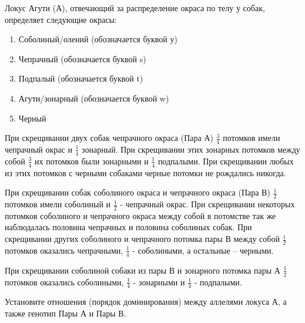 
Локус Агути (А), отвечающий за распределение окраса по телу у собак, определяет следующие окрасы:

\begin{enumerate}
    \item Соболиный/олений (обозначается буквой у)
    \item Чепрачный (обозначается буквой s) 
    \item Подпалый (обозначается буквой t) 
    \item Агути/зонарный (обозначается буквой w) \newline
    \item Черный
\end{enumerate}

При скрещивании двух собак чепрачного окраса (Пара А) $\frac{3}{4}$ потомков имели чепрачный окрас и $\frac{1}{4}$ зонарный. При скрещивании этих 
зонарных потомков между собой $\frac{3}{4}$ их потомков были зонарными и $\frac{1}{4}$ подпалыми. При скрещивании любых из этих потомков с черными собаками черные потомки не рождались никогда.

При скрещивании собак соболиного окраса и чепрачного окраса (Пара В) $\frac{1}{2}$ потомков имели соболиный и $\frac{1}{2}$ - чепрачный окрас. 
При скрещивании некоторых потомков соболиного и чепрачного окраса между собой в потомстве так же наблюдалась половина 
чепрачных и половина соболиных собак. При скрещивании других соболиного и чепрачного потомка пары В между собой $\frac{1}{2}$ 
потомков оказались чепрачными, $\frac{1}{4}$  - соболиными, а остальные – черными. 

При скрещивании соболиной собаки из пары В и зонарного потомка пары А $\frac{1}{2}$ потомков оказались соболиными, $\frac{1}{4}$ - зонарными и $\frac{1}{4}$ - подпалыми.

Установите отношения (порядок доминирования) между аллелями локуса А, а также генотип Пары А и Пары В.

